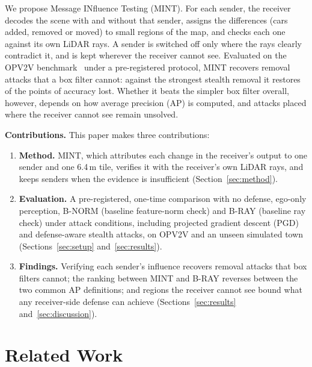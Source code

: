 \documentclass[conference]{IEEEtran}
\newcommand{\mint}{MINT}
\newcommand{\mintfull}{Message INfluence Testing}
\begin{document}
We propose \mintfull{} (\mint). For each sender, the receiver decodes the scene with and without that sender,
assigns the differences (cars added, removed or moved) to small regions of the map, and checks each one against its
own LiDAR rays. A sender is switched off only where the rays clearly contradict it, and is kept wherever the
receiver cannot see. Evaluated on the OPV2V benchmark~\cite{xu2022opv2v} under a pre-registered protocol, \mint{}
recovers removal attacks that a box filter cannot: against the strongest stealth removal it restores
\RestoredGlobPgdRemStStrongMINT{} of the \LossGlobPgdRemStStrong{} points of accuracy lost. Whether it beats the
simpler box filter overall, however, depends on how average precision (AP) is computed, and attacks placed where
the receiver cannot see remain unsolved.

\textbf{Contributions.} This paper makes three contributions:
\begin{enumerate}
\item \textbf{Method.} \mint, which attributes each change in the receiver's output to one sender and one 6.4\,m
tile, verifies it with the receiver's own LiDAR rays, and keeps senders when the evidence is insufficient
(Section~\ref{sec:method}).
\item \textbf{Evaluation.} A pre-registered, one-time comparison with no defense, ego-only perception, B-NORM
(baseline feature-norm check) and B-RAY (baseline ray check) under \NumConditions{} attack conditions, including
projected gradient descent (PGD) and defense-aware stealth attacks, on OPV2V and an unseen simulated town
(Sections~\ref{sec:setup} and~\ref{sec:results}).
\item \textbf{Findings.} Verifying each sender's influence recovers removal attacks that box filters cannot; the
ranking between \mint{} and B-RAY reverses between the two common AP definitions; and regions the receiver cannot
see bound what any receiver-side defense can achieve (Sections~\ref{sec:results} and~\ref{sec:discussion}).
\end{enumerate}

\section{Related Work}
\label{sec:related}
\end{document}
